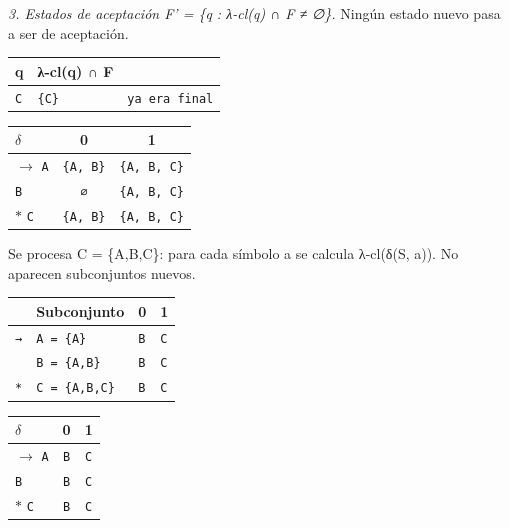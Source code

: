 \documentclass[11pt]{article}
\begin{document}
\textit{3. Estados de aceptación F' = \{q : λ-cl(q) ∩ F ≠ ∅\}.} Ningún estado nuevo pasa a ser de aceptación.
\begin{center}\footnotesize\begin{tabular}{lll}\toprule
q & λ-cl(q) ∩ F &  \\\midrule
\texttt{C} & \texttt{\{C\}} & \texttt{ya era final} \\
\bottomrule\end{tabular}\end{center}
\begin{center}\small\begin{tabular}{lcc}\toprule
$\delta$ & 0 & 1 \\\midrule
$\to$ \texttt{A} & \texttt{\{A, B\}} & \texttt{\{A, B, C\}} \\
 \texttt{B} & \texttt{∅} & \texttt{\{A, B, C\}} \\
$*$ \texttt{C} & \texttt{\{A, B\}} & \texttt{\{A, B, C\}} \\
\bottomrule\end{tabular}\end{center}
Se procesa C = \{A,B,C\}: para cada símbolo a se calcula λ-cl(δ(S, a)). No aparecen subconjuntos nuevos.
\begin{center}\footnotesize\begin{tabular}{llll}\toprule
 & Subconjunto & 0 & 1 \\\midrule
\texttt{→} & \texttt{A = \{A\}} & \texttt{B} & \texttt{C} \\
\texttt{} & \texttt{B = \{A,B\}} & \texttt{B} & \texttt{C} \\
\texttt{*} & \texttt{C = \{A,B,C\}} & \texttt{B} & \texttt{C} \\
\bottomrule\end{tabular}\end{center}
\begin{center}\small\begin{tabular}{lcc}\toprule
$\delta$ & 0 & 1 \\\midrule
$\to$ \texttt{A} & \texttt{B} & \texttt{C} \\
 \texttt{B} & \texttt{B} & \texttt{C} \\
$*$ \texttt{C} & \texttt{B} & \texttt{C} \\
\bottomrule\end{tabular}\end{center}
\end{document}
